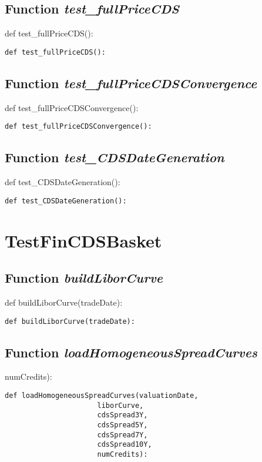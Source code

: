 \documentclass[twoside,11pt]{book}
\begin{document}
\subsection{Function {\it test\_fullPriceCDS}}
def test\_fullPriceCDS():

\begin{lstlisting}
def test_fullPriceCDS():
\end{lstlisting}

\subsection{Function {\it test\_fullPriceCDSConvergence}}
def test\_fullPriceCDSConvergence():

\begin{lstlisting}
def test_fullPriceCDSConvergence():
\end{lstlisting}

\subsection{Function {\it test\_CDSDateGeneration}}
def test\_CDSDateGeneration():

\begin{lstlisting}
def test_CDSDateGeneration():
\end{lstlisting}


\newpage
\section{TestFinCDSBasket}

\subsection{Function {\it buildLiborCurve}}
def buildLiborCurve(tradeDate):

\begin{lstlisting}
def buildLiborCurve(tradeDate):
\end{lstlisting}

\subsection{Function {\it loadHomogeneousSpreadCurves}}
numCredits):

\begin{lstlisting}
def loadHomogeneousSpreadCurves(valuationDate,
                      liborCurve,
                      cdsSpread3Y,
                      cdsSpread5Y,
                      cdsSpread7Y,
                      cdsSpread10Y,
                      numCredits):
\end{lstlisting}
\end{document}

